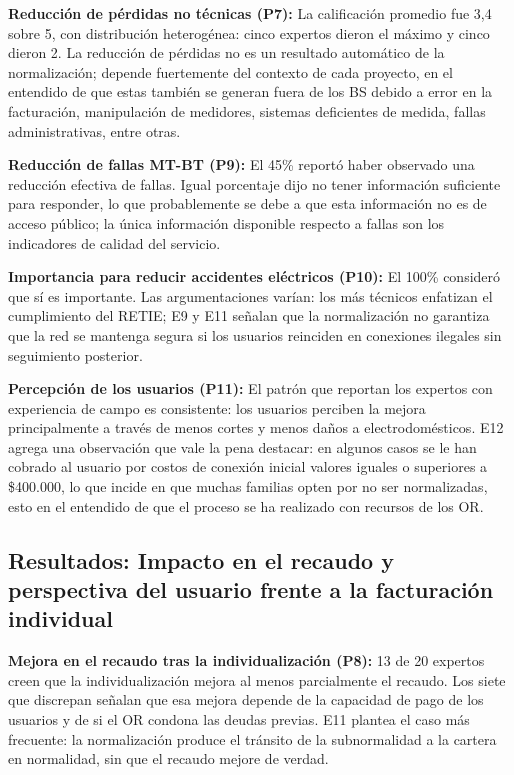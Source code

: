 \textbf{Reducción de pérdidas no técnicas (P7):} La calificación promedio fue 3,4 sobre 5, con distribución heterogénea: cinco expertos dieron el máximo y cinco dieron 2. La reducción de pérdidas no es un resultado automático de la normalización; depende fuertemente del contexto de cada proyecto, en el entendido de que estas también se generan fuera de los BS debido a error en la facturación, manipulación de medidores, sistemas deficientes de medida, fallas administrativas, entre otras.

\textbf{Reducción de fallas MT-BT (P9):} El 45\% reportó haber observado una reducción efectiva de fallas. Igual porcentaje dijo no tener información suficiente para responder, lo que probablemente se debe a que esta información no es de acceso público; la única información disponible respecto a fallas son los indicadores de calidad del servicio.

\textbf{Importancia para reducir accidentes eléctricos (P10):} El 100\% consideró que sí es importante. Las argumentaciones varían: los más técnicos enfatizan el cumplimiento del RETIE; E9 y E11 señalan que la normalización no garantiza que la red se mantenga segura si los usuarios reinciden en conexiones ilegales sin seguimiento posterior.

\textbf{Percepción de los usuarios (P11):} El patrón que reportan los expertos con experiencia de campo es consistente: los usuarios perciben la mejora principalmente a través de menos cortes y menos daños a electrodomésticos. E12 agrega una observación que vale la pena destacar: en algunos casos se le han cobrado al usuario por costos de conexión inicial valores iguales o superiores a \$400.000, lo que incide en que muchas familias opten por no ser normalizadas, esto en el entendido de que el proceso se ha realizado con recursos de los OR.

\subsection{Resultados: Impacto en el recaudo y perspectiva del usuario frente a la facturación individual}
\label{subsec:resultados_recaudo}

\textbf{Mejora en el recaudo tras la individualización (P8):} 13 de 20 expertos creen que la individualización mejora al menos parcialmente el recaudo. Los siete que discrepan señalan que esa mejora depende de la capacidad de pago de los usuarios y de si el OR condona las deudas previas. E11 plantea el caso más frecuente: la normalización produce el tránsito de la subnormalidad a la cartera en normalidad, sin que el recaudo mejore de verdad.

